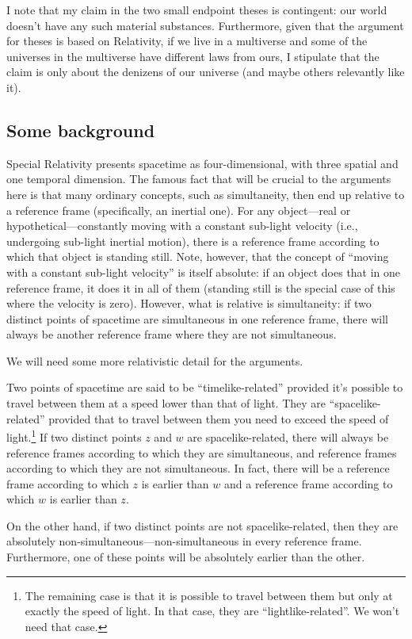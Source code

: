 I note that my claim in the two small endpoint theses is contingent: our world doesn't have any such material substances.
Furthermore, given that the argument for theses is based on Relativity, if we live in a multiverse and some of the
universes in the multiverse have different laws from ours, I stipulate that the claim is only about the denizens of our universe
(and maybe others relevantly like it).

\subsection{Some background}
Special Relativity presents spacetime as four-dimensional, with three spatial and one temporal dimension.
The famous fact that will be crucial to the arguments here is that many ordinary concepts, such as simultaneity,
then end up relative to a reference frame (specifically, an inertial one). For any object---real or hypothetical---constantly 
moving with a constant sub-light velocity (i.e., undergoing sub-light inertial motion), there is a reference frame according 
to which that object 
is standing still. Note, however, that the concept of ``moving with a constant sub-light velocity'' is itself absolute: 
if an object does that in one reference frame, it does it in all of them (standing still is the special case of this where
the velocity is zero). However, what is relative is simultaneity: if two distinct points of spacetime are simultaneous in one 
reference frame, there will always be another reference frame where they are not simultaneous. 

We will need some more relativistic detail for the arguments. 

Two points of spacetime are said to be ``timelike-related'' provided it's possible to travel between them 
at a speed lower than that of light. They are ``spacelike-related'' provided that to travel between them 
you need to exceed the speed of light.\footnote{The remaining case is that it is possible to travel between 
them but only at exactly the speed of light. In that case, they are ``lightlike-related''. We won't need that 
case.} If two distinct points $z$ and $w$ are spacelike-related, there will always be reference frames according to which they are 
simultaneous, and reference frames according to which they are not simultaneous. In fact, there will be a reference frame
according to which $z$ is earlier than $w$ and a reference frame according to which $w$ is earlier than $z$. 

On the other hand, if two distinct points are not spacelike-related, then they are absolutely non-simultaneous---non-simultaneous 
in every reference frame. Furthermore, one of these points will be absolutely earlier than the other.

